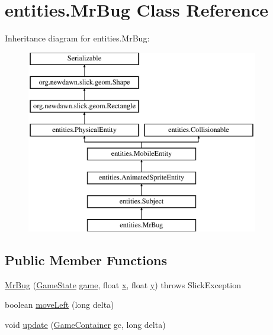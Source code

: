 \hypertarget{classentities_1_1_mr_bug}{}\section{entities.\+Mr\+Bug Class Reference}
\label{classentities_1_1_mr_bug}
Inheritance diagram for entities.\+Mr\+Bug\+:\begin{figure}[H]
\begin{center}
\leavevmode
\includegraphics[height=8.000000cm]{classentities_1_1_mr_bug}
\end{center}
\end{figure}
\subsection*{Public Member Functions}
\begin{DoxyCompactItemize}
\item 
\mbox{\hyperlink{classentities_1_1_mr_bug_a4f6f4739261744b12cd363b92b8819c6}{Mr\+Bug}} (\mbox{\hyperlink{classstates_1_1_game_state}{Game\+State}} \mbox{\hyperlink{classentities_1_1_mr_bug_a02458a7ed258fc3f99a097cf95bc036e}{game}}, float \mbox{\hyperlink{classorg_1_1newdawn_1_1slick_1_1geom_1_1_shape_a3e985bfff386c15a4efaad03d8ad60d3}{x}}, float \mbox{\hyperlink{classorg_1_1newdawn_1_1slick_1_1geom_1_1_shape_a9f934baded6a1b65ebb69e7e5f80ea00}{y}})  throws Slick\+Exception 
\item 
boolean \mbox{\hyperlink{classentities_1_1_mr_bug_ae1876c75b237e09d38c1e71d6d934685}{move\+Left}} (long delta)
\item 
void \mbox{\hyperlink{classentities_1_1_mr_bug_a5edd24b13e3ffd6eac09f8bfac9d5c8d}{update}} (\mbox{\hyperlink{classorg_1_1newdawn_1_1slick_1_1_game_container}{Game\+Container}} gc, long delta)
\end{DoxyCompactItemize}
